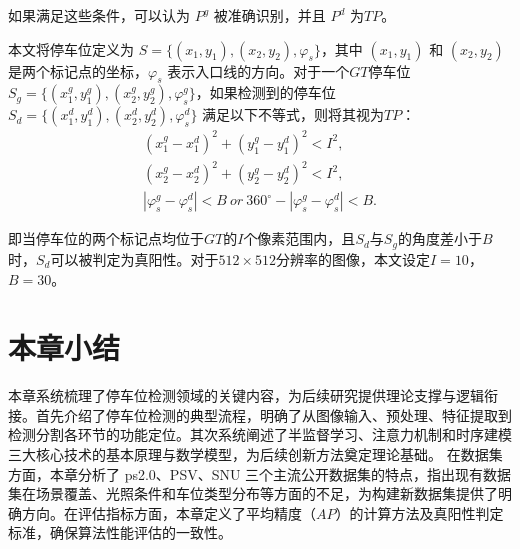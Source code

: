 如果满足这些条件，可以认为 $P^{g}$ 被准确识别，并且 $P^{d}$ 为$TP$。

本文将停车位定义为 $S=\{(x_{1}, y_{1}), (x_{2}, y_{2}), \varphi_{s}\}$，其中 $(x_{1}, y_{1})$ 和 $(x_{2}, y_{2})$ 是两个标记点的坐标，$\varphi_{s}$ 表示入口线的方向。对于一个$GT$停车位 $S_{g}=\{(x_{1}^{g}, y_{1}^{g}), (x_{2}^{g}, y_{2}^{g}), \varphi_{s}^{g}\}$，如果检测到的停车位 $S_{d}=\{(x_{1}^{d}, y_{1}^{d}), (x_{2}^{d}, y_{2}^{d}), \varphi_{s}^{d}\}$ 满足以下不等式，则将其视为$TP$：
\begin{align}
  (x_{1}^{g}-x_{1}^{d})^{2} + (y_{1}^{g}-y_{1}^{d})^{2} < I^{2}, \\
(x_{2}^{g}-x_{2}^{d})^{2} + (y_{2}^{g}-y_{2}^{d})^{2} < I^{2}, \\
|\varphi_{s}^{g} - \varphi_{s}^{d}| < B \ or \ 360^{\circ} - |\varphi_{s}^{g} - \varphi_{s}^{d}| < B.
\end{align}


即当停车位的两个标记点均位于$GT$的$I$个像素范围内，且$S_{d}$与$S_{g}$的角度差小于$B$时，$S_{d}$可以被判定为真阳性。对于$512 \times 512$分辨率的图像，本文设定$I=10$，$B=30$。


\section{本章小结}

本章系统梳理了停车位检测领域的关键内容，为后续研究提供理论支撑与逻辑衔接。首先介绍了停车位检测的典型流程，明确了从图像输入、预处理、特征提取到检测分割各环节的功能定位。其次系统阐述了半监督学习、注意力机制和时序建模三大核心技术的基本原理与数学模型，为后续创新方法奠定理论基础。
在数据集方面，本章分析了 ps2.0、PSV、SNU 三个主流公开数据集的特点，指出现有数据集在场景覆盖、光照条件和车位类型分布等方面的不足，为构建新数据集提供了明确方向。在评估指标方面，本章定义了平均精度（$AP$）的计算方法及真阳性判定标准，确保算法性能评估的一致性。
